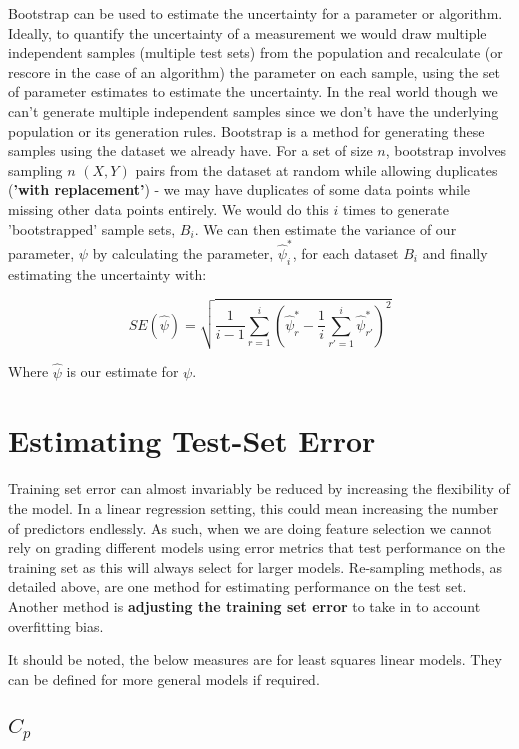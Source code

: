 Bootstrap can be used to estimate the uncertainty for a parameter or algorithm. Ideally, to quantify the uncertainty of a measurement we would draw multiple independent samples (multiple test sets) from the population and recalculate (or rescore in the case of an algorithm) the parameter on each sample, using the set of parameter estimates to estimate the uncertainty. In the real world though we can't generate multiple independent samples since we don't have the underlying population or its generation rules. Bootstrap is a method for generating these samples using the dataset we already have. For a set of size $n$, bootstrap involves sampling $n$ $(X,Y)$ pairs from the dataset at random while allowing duplicates (\textbf{'with replacement'}) - we may have duplicates of some data points while missing other data points entirely. We would do this $i$ times to generate 'bootstrapped' sample sets, $B_{i}$. We can then estimate the variance of our parameter, $\psi$ by calculating the parameter, $\hat{\psi}^{*}_{i}$, for each dataset $B_{i}$ and finally estimating the uncertainty with:

$$ SE(\hat{\psi}) = \sqrt{ \frac{1}{i-1}\sum^{i}_{r=1}\left( \hat{\psi}^{*}_{r} - \frac{1}{i}\sum^{i}_{r'=1} \hat{\psi}^{*}_{r'} \right)^{2}} $$

Where $\hat{\psi}$ is our estimate for $\psi$.

\section{Estimating Test-Set Error}

Training set error can almost invariably be reduced by increasing the flexibility of the model. In a linear regression setting, this could mean increasing the number of predictors endlessly. As such, when we are doing feature selection we cannot rely on grading different models using error metrics that test performance on the training set as this will always select for larger models. Re-sampling methods, as detailed above, are one method for estimating performance on the test set. Another method is \textbf{adjusting the training set error} to take in to account overfitting bias.

It should be noted, the below measures are for least squares linear models. They can be defined for more general models if required.

\subsection{$C_{p}$}

